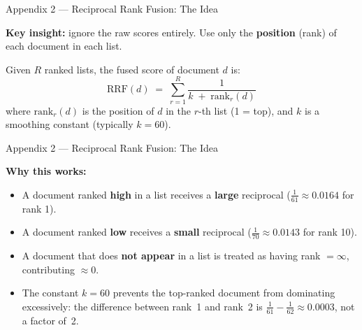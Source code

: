 \documentclass[aspectratio=169]{beamer}
\begin{document}
%
%
\begin{frame}{Appendix 2 --- Reciprocal Rank Fusion: The Idea}

\textbf{Key insight:} ignore the raw scores entirely.
Use only the \textbf{position} (rank) of each document in each list.

\bigskip

\begin{tcolorbox}[colback=blue!5!white, colframe=blue!75!black,
  title=\textbf{RRF formula}]
Given $R$ ranked lists, the fused score of document $d$ is:
\[
  \text{RRF}(d)
  \;=\;
  \sum_{r=1}^{R}
  \frac{1}{k \;+\; \text{rank}_r(d)}
\]
where $\text{rank}_r(d)$ is the position of $d$ in the $r$-th list
(1 = top), and $k$ is a smoothing constant (typically $k=60$).
\end{tcolorbox}
\end{frame}
%
%
\begin{frame}{Appendix 2 --- Reciprocal Rank Fusion: The Idea}

\textbf{Why this works:}
\begin{itemize}
\item A document ranked \textbf{high} in a list receives a
      \textbf{large} reciprocal ($\frac{1}{61} \approx 0.0164$
      for rank 1).
\item A document ranked \textbf{low} receives a
      \textbf{small} reciprocal ($\frac{1}{70} \approx 0.0143$
      for rank 10).
\item A document that does \textbf{not appear} in a list
      is treated as having rank $= \infty$, contributing $\approx 0$.
\item The constant $k=60$ prevents the top-ranked document
      from dominating excessively: the difference between
      rank~1 and rank~2 is $\frac{1}{61} - \frac{1}{62} \approx 0.0003$,
      not a factor of~2.
\end{itemize}

\end{frame}
%
%
\end{document}
